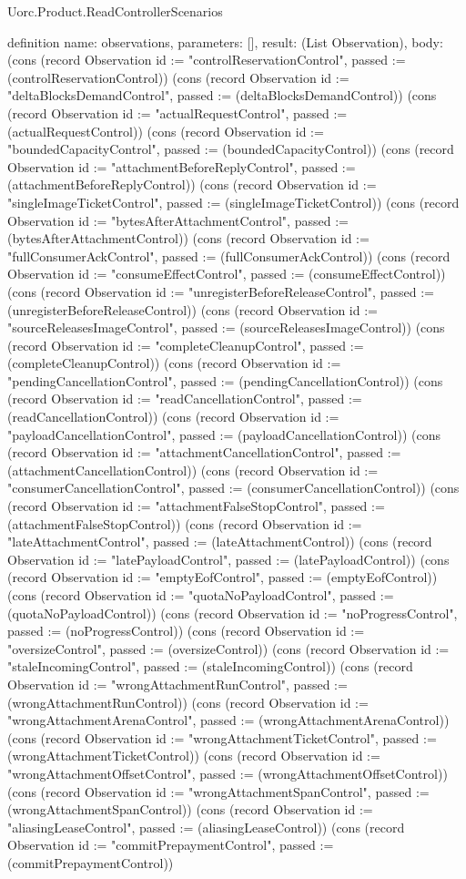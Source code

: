 \begin{lexlean}{Uorc.Product.ReadControllerScenarios}
\begin{semanticmodule}
definition{
  name: observations,
  parameters: [],
  result: (List Observation),
  body: (cons (record Observation {id := "controlReservationControl", passed := (controlReservationControl)}) (cons (record Observation {id := "deltaBlocksDemandControl", passed := (deltaBlocksDemandControl)}) (cons (record Observation {id := "actualRequestControl", passed := (actualRequestControl)}) (cons (record Observation {id := "boundedCapacityControl", passed := (boundedCapacityControl)}) (cons (record Observation {id := "attachmentBeforeReplyControl", passed := (attachmentBeforeReplyControl)}) (cons (record Observation {id := "singleImageTicketControl", passed := (singleImageTicketControl)}) (cons (record Observation {id := "bytesAfterAttachmentControl", passed := (bytesAfterAttachmentControl)}) (cons (record Observation {id := "fullConsumerAckControl", passed := (fullConsumerAckControl)}) (cons (record Observation {id := "consumeEffectControl", passed := (consumeEffectControl)}) (cons (record Observation {id := "unregisterBeforeReleaseControl", passed := (unregisterBeforeReleaseControl)}) (cons (record Observation {id := "sourceReleasesImageControl", passed := (sourceReleasesImageControl)}) (cons (record Observation {id := "completeCleanupControl", passed := (completeCleanupControl)}) (cons (record Observation {id := "pendingCancellationControl", passed := (pendingCancellationControl)}) (cons (record Observation {id := "readCancellationControl", passed := (readCancellationControl)}) (cons (record Observation {id := "payloadCancellationControl", passed := (payloadCancellationControl)}) (cons (record Observation {id := "attachmentCancellationControl", passed := (attachmentCancellationControl)}) (cons (record Observation {id := "consumerCancellationControl", passed := (consumerCancellationControl)}) (cons (record Observation {id := "attachmentFalseStopControl", passed := (attachmentFalseStopControl)}) (cons (record Observation {id := "lateAttachmentControl", passed := (lateAttachmentControl)}) (cons (record Observation {id := "latePayloadControl", passed := (latePayloadControl)}) (cons (record Observation {id := "emptyEofControl", passed := (emptyEofControl)}) (cons (record Observation {id := "quotaNoPayloadControl", passed := (quotaNoPayloadControl)}) (cons (record Observation {id := "noProgressControl", passed := (noProgressControl)}) (cons (record Observation {id := "oversizeControl", passed := (oversizeControl)}) (cons (record Observation {id := "staleIncomingControl", passed := (staleIncomingControl)}) (cons (record Observation {id := "wrongAttachmentRunControl", passed := (wrongAttachmentRunControl)}) (cons (record Observation {id := "wrongAttachmentArenaControl", passed := (wrongAttachmentArenaControl)}) (cons (record Observation {id := "wrongAttachmentTicketControl", passed := (wrongAttachmentTicketControl)}) (cons (record Observation {id := "wrongAttachmentOffsetControl", passed := (wrongAttachmentOffsetControl)}) (cons (record Observation {id := "wrongAttachmentSpanControl", passed := (wrongAttachmentSpanControl)}) (cons (record Observation {id := "aliasingLeaseControl", passed := (aliasingLeaseControl)}) (cons (record Observation {id := "commitPrepaymentControl", passed := (commitPrepaymentControl)}) }
\end{semanticmodule}
\end{lexlean}
